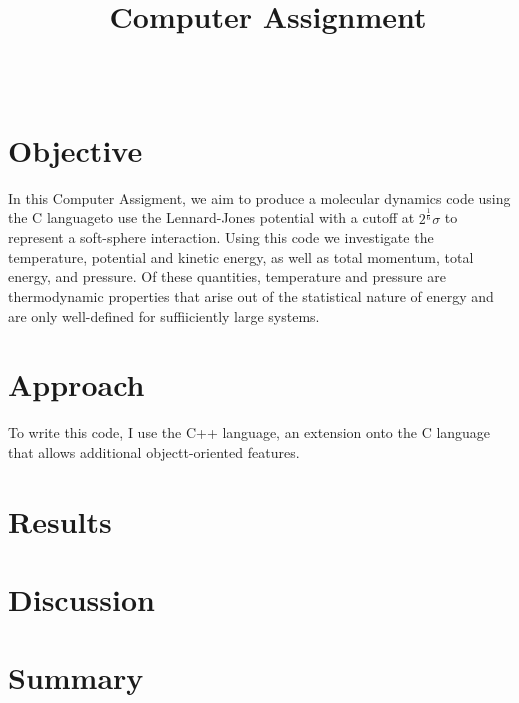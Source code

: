 \documentclass[10pt]{article}
\title{\coursenumber\ Computer Assignment \homeworkcount}
\author{\teachername\\ \studentname}
\date{\duedate}
\begin{document}
\maketitle
\tableofcontents
\newpage

\section{Objective}

In this Computer Assigment, we aim to produce a molecular dynamics code using the C languageto use
the Lennard-Jones potential with a cutoff at $2^\frac{1}{6}\sigma$ to represent a soft-sphere
interaction. Using this code we investigate the temperature, potential and kinetic energy, as well
as total momentum, total energy, and pressure. Of these quantities, temperature and pressure are
thermodynamic properties that arise out of the statistical nature of energy and are only
well-defined for suffiiciently large systems.

\section{Approach}

To write this code, I use the C++ language, an extension onto the C language that allows additional
objectt-oriented features.

\section{Results}
\section{Discussion}
\section{Summary}
\end{document}
